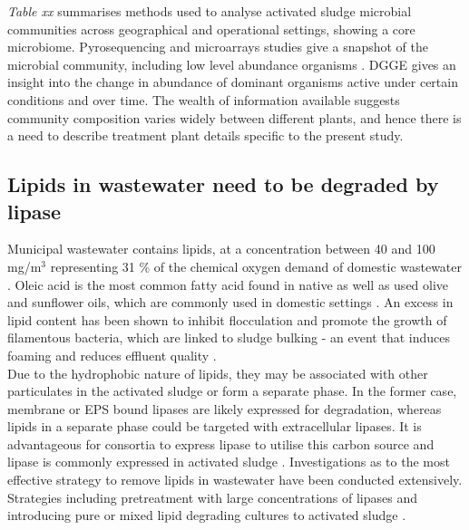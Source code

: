 \documentclass[11pt]{article}
\begin{document}
\emph{Table xx} summarises methods used to analyse activated sludge microbial communities across geographical and operational settings, showing a core microbiome. Pyrosequencing and microarrays studies give a snapshot of the microbial community, including low level abundance organisms \cite{ranasinghe2012revealing}. DGGE gives an insight into the change in abundance of dominant organisms active under certain conditions and over time. The wealth of information available suggests community composition varies widely between different plants, and hence there is a need to describe treatment plant details specific to the present study.
\FloatBarrier

\subsection{Lipids in wastewater need to be degraded by lipase}
Municipal wastewater contains lipids, at a concentration between 40 and 100 mg/m$^{3}$ \cite{Forster_92} representing 31 \% of the chemical oxygen demand of domestic wastewater \cite{Raunkjaer_94}. Oleic acid is the most common fatty acid found in native as well as used olive and sunflower oils, which are commonly used in domestic settings \cite{haba2000isolation}.  An excess in lipid content has been shown to inhibit flocculation and promote the growth of filamentous bacteria, which are linked to sludge bulking - an event that induces foaming and reduces effluent quality \cite{Forster_92}.\\

Due to the hydrophobic nature of lipids, they may be associated with other particulates in the activated sludge or form a separate phase. In the former case, membrane or EPS bound lipases are likely expressed for degradation, whereas lipids in a separate phase could be targeted with extracellular lipases. It is advantageous for consortia to express lipase to utilise this carbon source and lipase is commonly expressed in activated sludge \cite{gessesse2003lipase}. Investigations as to the most effective strategy to remove lipids in wastewater have been conducted extensively. Strategies including pretreatment with large concentrations of lipases and introducing pure or mixed lipid degrading cultures to activated sludge \cite{Wakelin_97}. \\%
\end{document}
